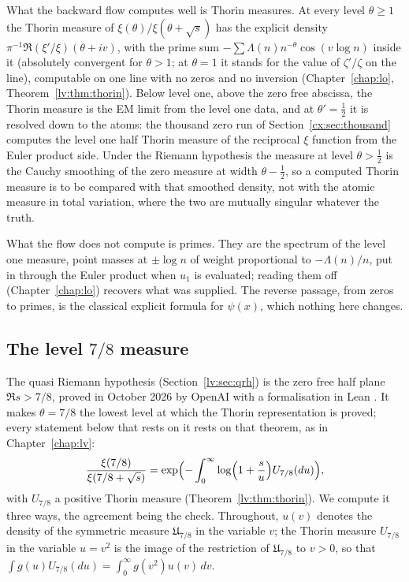 What the backward flow computes well is Thorin measures. At every level $\theta\ge1$ the Thorin measure of $\xi(\theta)/\xi(\theta+\sqrt s)$ has the explicit density $\pi^{-1}\Re(\xi'/\xi)(\theta+iv)$, with the prime sum $-\sum\Lambda(n)n^{-\theta}\cos(v\log n)$ inside it (absolutely convergent for $\theta>1$; at $\theta=1$ it stands for the value of $\zeta'/\zeta$ on the line), computable on one line with no zeros and no inversion (Chapter~\ref{chap:lo}, Theorem~\ref{lv:thm:thorin}). Below level one, above the zero free abscissa, the Thorin measure is the EM limit from the level one data, and at $\theta'=\tfrac12$ it is resolved down to the atoms: the thousand zero run of Section~\ref{cx:sec:thousand} computes the level one half Thorin measure of the reciprocal $\xi$ function from the Euler product side. Under the Riemann hypothesis the measure at level $\theta>\tfrac12$ is the Cauchy smoothing of the zero measure at width $\theta-\tfrac12$, so a computed Thorin measure is to be compared with that smoothed density, not with the atomic measure in total variation, where the two are mutually singular whatever the truth.

What the flow does not compute is primes. They are the spectrum of the level one measure, point masses at $\pm\log n$ of weight proportional to $-\Lambda(n)/n$, put in through the Euler product when $u_1$ is evaluated; reading them off (Chapter~\ref{chap:lo}) recovers what was supplied. The reverse passage, from zeros to primes, is the classical explicit formula for $\psi(x)$, which nothing here changes.

\subsection{The level $7/8$ measure}

The quasi Riemann hypothesis (Section~\ref{lv:sec:qrh}) is the zero free half plane $\Re s>7/8$, proved in October 2026 by OpenAI with a formalisation in Lean \cite{OAI26a}. It makes $\theta=7/8$ the lowest level at which the Thorin representation is proved; every statement below that rests on it rests on that theorem, as in Chapter~\ref{chap:lv}:
\begin{equation}\label{cx:eq:F78}
\frac{\xi(7/8)}{\xi(7/8+\sqrt s)}=\exp\Bigl(-\int_0^\infty\log\Bigl(1+\frac su\Bigr)U_{7/8}(du)\Bigr),
\end{equation}
with $U_{7/8}$ a positive Thorin measure (Theorem~\ref{lv:thm:thorin}). We compute it three ways, the agreement being the check. Throughout, $u(v)$ denotes the density of the symmetric measure $\mathfrak U_{7/8}$ in the variable $v$; the Thorin measure $U_{7/8}$ in the variable $u=v^2$ is the image of the restriction of $\mathfrak U_{7/8}$ to $v>0$, so that $\int g(u)U_{7/8}(du)=\int_0^\infty g(v^2)u(v)\,dv$.

